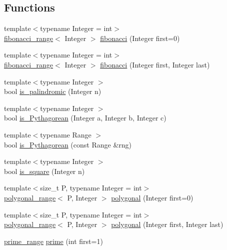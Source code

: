 \subsection*{\-Functions}
\begin{DoxyCompactItemize}
\item 
{\footnotesize template$<$typename Integer  = int$>$ }\\\hyperlink{classyuh_1_1fibonacci__range}{fibonacci\-\_\-range}$<$ \-Integer $>$ \hyperlink{namespaceyuh_a11988532f81d143e1b5b74d461dd8067}{fibonacci} (\-Integer first=0)
\item 
{\footnotesize template$<$typename Integer  = int$>$ }\\\hyperlink{classyuh_1_1fibonacci__range}{fibonacci\-\_\-range}$<$ \-Integer $>$ \hyperlink{namespaceyuh_a17b1d33879798b95bdefe171df90380a}{fibonacci} (\-Integer first, \-Integer last)
\item 
{\footnotesize template$<$typename Integer $>$ }\\bool \hyperlink{namespaceyuh_afc7f4ca69e0d8cb035be348d77d2a33e}{is\-\_\-palindromic} (\-Integer n)
\item 
{\footnotesize template$<$typename Integer $>$ }\\bool \hyperlink{namespaceyuh_a14298c4b76f1a9d0537e7d5d67cfa784}{is\-\_\-\-Pythagorean} (\-Integer a, \-Integer b, \-Integer c)
\item 
{\footnotesize template$<$typename Range $>$ }\\bool \hyperlink{namespaceyuh_af94deeef5a14f79a6a51c6ca3155d03e}{is\-\_\-\-Pythagorean} (const \-Range \&rng)
\item 
{\footnotesize template$<$typename Integer $>$ }\\bool \hyperlink{namespaceyuh_a43d71ed08fec121213f4ad3acbdc4d26}{is\-\_\-square} (\-Integer n)
\item 
{\footnotesize template$<$size\-\_\-t \-P, typename Integer  = int$>$ }\\\hyperlink{classyuh_1_1polygonal__range}{polygonal\-\_\-range}$<$ \-P, \-Integer $>$ \hyperlink{namespaceyuh_ad748e41a574e1b3042a2741cf023c40c}{polygonal} (\-Integer first=0)
\item 
{\footnotesize template$<$size\-\_\-t \-P, typename Integer  = int$>$ }\\\hyperlink{classyuh_1_1polygonal__range}{polygonal\-\_\-range}$<$ \-P, \-Integer $>$ \hyperlink{namespaceyuh_a1af8d0faca38b0efb8ae71d0f773d3c8}{polygonal} (\-Integer first, \-Integer last)
\item 
\hyperlink{classyuh_1_1prime__range}{prime\-\_\-range} \hyperlink{namespaceyuh_ad0e08caa71b8e5172b1535657bbc0648}{prime} (int first=1)

\end{DoxyCompactItemize}

